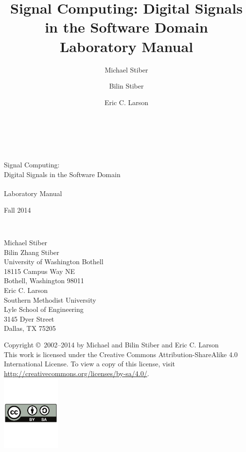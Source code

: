 \documentclass[12pt]{article}
\title{Signal Computing: Digital Signals in the Software
  Domain\\[2\parskip]
Laboratory Manual}
\author{Michael Stiber \and Bilin Stiber \and Eric C. Larson}
\begin{document}
\begin{titlepage}

\mbox{}\\[0.5in]
\begin{center}
\mbox{}\hrulefill\mbox{}\\[0.25in]
{\Huge Signal Computing:}\\[0.25in]
{\LARGE Digital Signals in the Software Domain}\\[0.25in]
\mbox{}\hrulefill\mbox{}\\[0.5in]
{\Huge Laboratory Manual}\\[2.5in]

\mbox{}\hfill
\parbox{1.5in}{\mbox{}}
\parbox{3in}{Fall 2014}\\[0.25in]
\mbox{}\hfill
\parbox{3in}{\raggedright
Michael Stiber\\
Bilin Zhang Stiber\\
University of Washington Bothell\\
18115 Campus Way NE\\
Bothell, Washington 98011\\[0.25in]
Eric C. Larson\\
Southern Methodist University\\
Lyle School of Engineering\\
3145 Dyer Street\\
Dallas, TX 75205}
\end{center}

\newpage
\mbox{}\vspace{4in}
\begin{flushright}
Copyright \copyright\ 2002--2014 by Michael and Bilin Stiber and Eric
C. Larson\\[2in]
This work is licensed under the Creative Commons
Attribution-ShareAlike 4.0 International License. To view a copy of
this license, visit
\url{http://creativecommons.org/licenses/by-sa/4.0/}.\\
\includegraphics[height=1.5in]{by-sa}
\end{flushright}

\thispagestyle{empty}

\end{titlepage}

\tableofcontents










\end{document}
